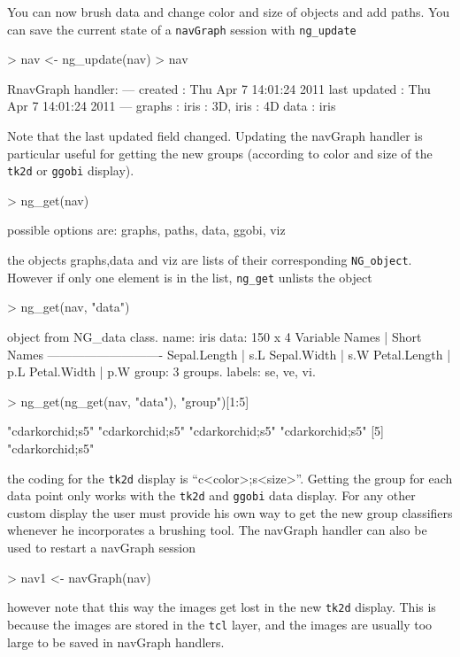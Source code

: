 \documentclass[12pt,oneside,titlepage,letter]{article}
\begin{document}
You can now brush data and change color and size of objects and add paths. You can save the current state of a \texttt{navGraph} session with \texttt{ng\_update}
\begin{Schunk}
\begin{Sinput}
> nav <- ng_update(nav)
> nav
\end{Sinput}
\begin{Soutput}
RnavGraph handler:
---
created       : Thu Apr  7 14:01:24 2011 
last updated  : Thu Apr  7 14:01:24 2011 
---
graphs        : iris : 3D, iris : 4D 
data          : iris 
\end{Soutput}
\end{Schunk}
Note that the last updated field changed. Updating the navGraph handler is particular useful for getting the new groups (according to color and size of the \texttt{tk2d} or \texttt{ggobi} display).
\begin{Schunk}
\begin{Sinput}
> ng_get(nav)
\end{Sinput}
\begin{Soutput}
possible options are: graphs, paths, data, ggobi, viz
\end{Soutput}
\end{Schunk}
the objects graphs,data and viz are lists of their corresponding \texttt{NG\_object}. However if only one element is in the list, \texttt{ng\_get} unlists the object
\begin{Schunk}
\begin{Sinput}
> ng_get(nav, "data")
\end{Sinput}
\begin{Soutput}
object from NG_data class.
  name: iris 
  data: 150 x 4 
    Variable Names | Short Names
    ----------------------------
    Sepal.Length   | s.L
    Sepal.Width    | s.W
    Petal.Length   | p.L
    Petal.Width    | p.W
  group:  3 groups.
  labels: se, ve, vi. 
\end{Soutput}
\begin{Sinput}
> ng_get(ng_get(nav, "data"), "group")[1:5]
\end{Sinput}
\begin{Soutput}
[1] "cdarkorchid;s5" "cdarkorchid;s5" "cdarkorchid;s5" "cdarkorchid;s5"
[5] "cdarkorchid;s5"
\end{Soutput}
\end{Schunk}
the coding for the \texttt{tk2d} display is ``c<color>;s<size>''. Getting the group for each data point only works with the \texttt{tk2d} and \texttt{ggobi} data display. For any other custom display the user must provide his own way to get the new group classifiers whenever he incorporates a brushing tool. The navGraph handler can also be used to restart a navGraph session
\begin{Schunk}
\begin{Sinput}
> nav1 <- navGraph(nav)
\end{Sinput}
\end{Schunk}
however note that this way the images get lost in the new \texttt{tk2d} display. This is because the images are stored in the \texttt{tcl} layer, and the images are usually too large to be saved in navGraph handlers.\\
\end{document}
